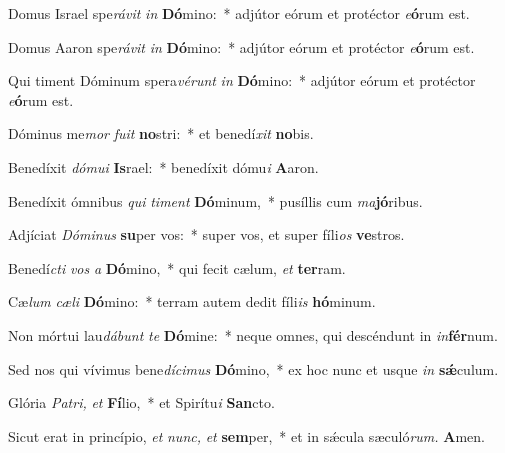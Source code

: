 \item Domus Israel spe\hspace{0.03em}\textit{rávit} \textit{in} \textbf{Dó}mino:~* adjútor eórum et protéctor \textit{e}\textbf{ó}rum est.
\item Domus Aaron spe\hspace{0.03em}\textit{rávit} \textit{in} \textbf{Dó}mino:~* adjútor eórum et protéctor \textit{e}\textbf{ó}rum est.
\item Qui timent Dóminum spera\hspace{0.03em}\textit{vérunt} \textit{in} \textbf{Dó}mino:~* adjútor eórum et protéctor \textit{e}\textbf{ó}rum est.
\item Dóminus me\hspace{0.03em}\textit{mor} \textit{fuit} \textbf{no}stri:~* et benedí\hspace{0.03em}\textit{xit} \textbf{no}bis.
\item Benedíxit \textit{dómui} \textbf{Is}rael:~* benedíxit dómu\textit{i} \textbf{A}aron.
\item Benedíxit ómnibus \textit{qui} \textit{timent} \textbf{Dó}minum,~* pusíllis cum \textit{ma}\textbf{jó}ribus.
\item Adjíciat \textit{Dóminus} \textbf{su}per vos:~* super vos, et super fíli\textit{os} \textbf{ve}stros.
\item Benedí\hspace{0.03em}\textit{cti} \textit{vos} \textit{a} \textbf{Dó}mino,~* qui fecit cælum, \textit{et} \textbf{ter}ram.
\item Cæ\hspace{0.03em}\textit{lum} \textit{cæli} \textbf{Dó}mino:~* terram autem dedit fíli\textit{is} \textbf{hó}minum.
\item Non mórtui lau\hspace{0.03em}\textit{dábunt} \textit{te} \textbf{Dó}mine:~* neque omnes, qui descéndunt in \textit{in}\textbf{fér}num.
\item Sed nos qui vívimus bene\hspace{0.03em}\hspace{0.03em}\textit{dícimus} \textbf{Dó}mino,~* ex hoc nunc et usque \textit{in} \textbf{sǽ}culum.
\item Glória \textit{Patri,} \textit{et} \textbf{Fí}lio,~* et Spirítu\hspace{0.03em}\textit{i} \textbf{San}cto.
\item Sicut erat in princípio, \textit{et} \textit{nunc,} \textit{et} \textbf{sem}per,~* et in sǽcula sæculó\textit{rum.} \textbf{A}men.
